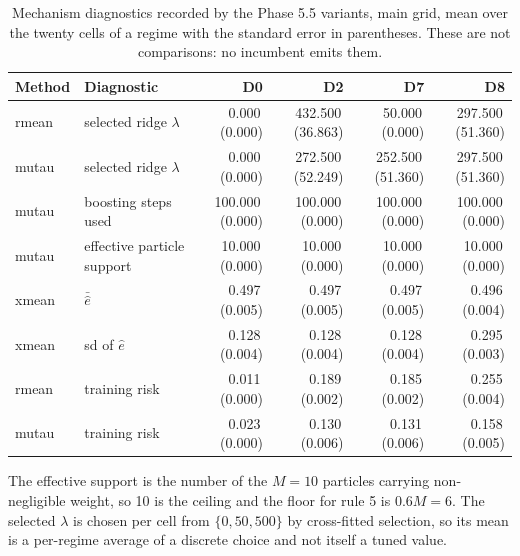 \begin{table}[htbp]
\centering
\caption{Mechanism diagnostics recorded by the Phase 5.5 variants, main grid, mean over the twenty cells of a regime with the standard error in parentheses. These are not comparisons: no incumbent emits them.}
\label{tab:p55-diagnostics}
\scriptsize
\setlength{\tabcolsep}{4pt}
\begin{tabular}{@{}llrrrr@{}}
\toprule
Method & Diagnostic & D0 & D2 & D7 & D8 \\
\midrule
rmean & selected ridge $\lambda$ & 0.000\,(0.000) & 432.500\,(36.863) & 50.000\,(0.000) & 297.500\,(51.360) \\
mutau & selected ridge $\lambda$ & 0.000\,(0.000) & 272.500\,(52.249) & 252.500\,(51.360) & 297.500\,(51.360) \\
mutau & boosting steps used & 100.000\,(0.000) & 100.000\,(0.000) & 100.000\,(0.000) & 100.000\,(0.000) \\
mutau & effective particle support & 10.000\,(0.000) & 10.000\,(0.000) & 10.000\,(0.000) & 10.000\,(0.000) \\
xmean & $\bar{\hat e}$ & 0.497\,(0.005) & 0.497\,(0.005) & 0.497\,(0.005) & 0.496\,(0.004) \\
xmean & sd of $\hat e$ & 0.128\,(0.004) & 0.128\,(0.004) & 0.128\,(0.004) & 0.295\,(0.003) \\
rmean & training risk & 0.011\,(0.000) & 0.189\,(0.002) & 0.185\,(0.002) & 0.255\,(0.004) \\
mutau & training risk & 0.023\,(0.000) & 0.130\,(0.006) & 0.131\,(0.006) & 0.158\,(0.005) \\
\bottomrule
\end{tabular}
\par\vspace{2pt}\parbox{0.94\textwidth}{\scriptsize The effective support is the number of the $M=10$ particles carrying non-negligible weight, so 10 is the ceiling and the floor for rule 5 is $0.6M=6$. The selected $\lambda$ is chosen per cell from $\{0, 50, 500\}$ by cross-fitted selection, so its mean is a per-regime average of a discrete choice and not itself a tuned value.}
\end{table}

